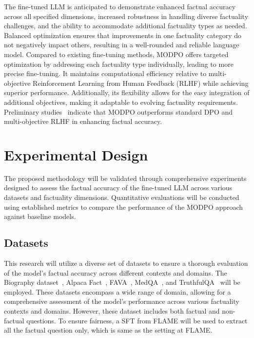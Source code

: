 \documentclass{article}
\begin{document}
The fine-tuned LLM is anticipated to demonstrate enhanced factual accuracy across all specified dimensions, increased robustness in handling diverse factuality challenges, and the ability to accommodate additional factuality types as needed. Balanced optimization ensures that improvements in one factuality category do not negatively impact others, resulting in a well-rounded and reliable language model. Compared to existing fine-tuning methods, MODPO offers targeted optimization by addressing each factuality type individually, leading to more precise fine-tuning. It maintains computational efficiency relative to multi-objective Reinforcement Learning from Human Feedback (RLHF) while achieving superior performance. Additionally, its flexibility allows for the easy integration of additional objectives, making it adaptable to evolving factuality requirements. Preliminary studies~\cite{OnePreferenceFitsAllAlignmentMultiObjectiveDirectPreference2024} indicate that MODPO outperforms standard DPO and multi-objective RLHF in enhancing factual accuracy.


\section{Experimental Design}

The proposed methodology will be validated through comprehensive experiments designed to assess the factual accuracy of the fine-tuned LLM across various datasets and factuality dimensions. Quantitative evaluations will be conducted using established metrics to compare the performance of the MODPO approach against baseline models.


\subsection{Datasets}
This research will utilize a diverse set of datasets to ensure a thorough evaluation of the model’s factual accuracy across different contexts and domains. The Biography dataset~\cite{FActScoreFinegrainedAtomicEvaluationFactual2023}, Alpaca Fact~\cite{lin_flame_2024}, FAVA~\cite{FinegrainedHallucinationDetectionEditingLanguage2024}, MedQA~\cite{pmlr-v174-pal22a}, and TruthfulQA~\cite{TruthfulQAMeasuringHowModelsMimic2022} will be employed. These datasets encompass a wide range of domain, allowing for a comprehensive assessment of the model’s performance across various factuality contexts and domains. However, these dataset includes both factual and non-factual questions. To ensure fairness, a SFT from FLAME will be used to extract all the factual question only, which is same as the setting at FLAME.
\end{document}
